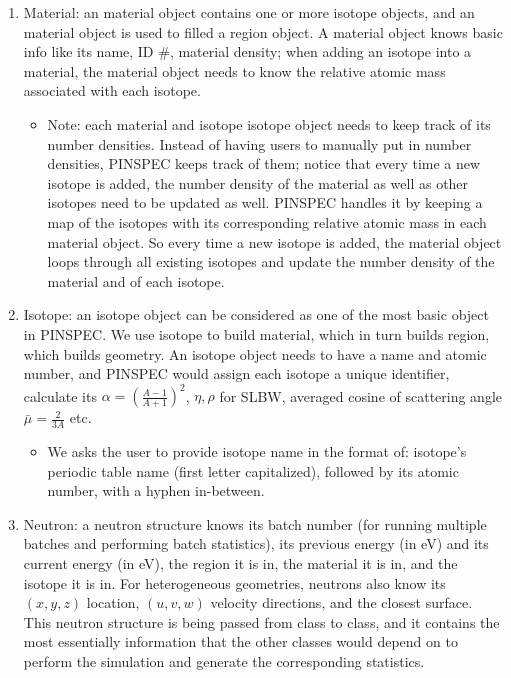 \documentclass[titlepage]{article}
\begin{document}
\begin{enumerate}
\item Material: an material object contains one or more isotope objects, and an material object is used to filled a region object. A material object knows basic info like its name, ID \#, material density; when adding an isotope into a material, the material object needs to know the relative atomic mass associated with each isotope. 
  \begin{itemize}
  \item Note: each material and isotope isotope object needs to keep track of its number densities. Instead of having users to manually put in number densities, PINSPEC keeps track of them; notice that every time a new isotope is added, the number density of the material as well as other isotopes need to be updated as well. PINSPEC handles it by keeping a map of the isotopes with its corresponding relative atomic mass in each material object. So every time a new isotope is added, the material object loops through all existing isotopes and update the number density of the material and of each isotope. 
  \end{itemize}

\item Isotope: an isotope object can be considered as one of the most basic object in PINSPEC. We use isotope to build material, which in turn builds region, which builds geometry. An isotope object needs to have a name and atomic number, and PINSPEC would assign each isotope a unique identifier, calculate its $\displaystyle \alpha = \left(\frac{A-1}{A+1}\right)^2$, $\eta, \rho$ for SLBW, averaged cosine of scattering angle $\displaystyle \bar{\mu} = \frac{2}{3A}$ etc. 
  \begin{itemize}
    \item We asks the user to provide isotope name in the format of: isotope's periodic table name (first letter capitalized), followed by its atomic number, with a hyphen in-between.
  \end{itemize}

\item Neutron: a neutron structure knows its batch number (for running multiple batches and performing batch statistics), its previous energy (in eV) and its current energy (in eV), the region it is in, the material it is in, and the isotope it is in. For heterogeneous geometries, neutrons also know its $(x,y,z)$ location, $(u,v,w)$ velocity directions, and the closest surface. This neutron structure is being passed from class to class, and it contains the most essentially information that the other classes would depend on to perform the simulation and generate the corresponding statistics. 


\end{enumerate}
\end{document}
